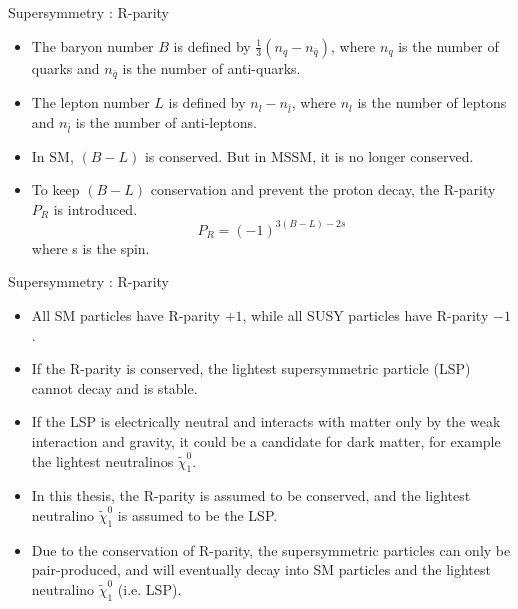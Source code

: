 \documentclass[mathserif,serif]{beamer}
\begin{document}
\begin{frame}{Supersymmetry : R-parity}
\begin{itemize}
\item The baryon number $B$ is defined by $\frac{1}{3} (n_q - n_{\bar{q}})$, where $n_q$ is the number of quarks and $n_{\bar{q}}$ is the number of anti-quarks.
\item The lepton number $L$ is defined by $n_l - n_{\bar{l}}$, where $n_l$ is the number of leptons and $n_{\bar{l}}$ is the number of anti-leptons.
\item In SM, $(B-L)$ is conserved. But in MSSM, it is no longer conserved.
\item To keep $(B-L)$ conservation and prevent the proton decay, the R-parity $P_R$ is introduced.
\begin{equation*}
P_R = (-1)^{3(B-L)-2s}
\end{equation*}
where s is the spin.
\end{itemize}
\end{frame}

\begin{frame}{Supersymmetry : R-parity}
\begin{itemize}
\item All SM particles have R-parity $+1$, while all SUSY particles have R-parity $-1$.
\item If the R-parity is conserved, the lightest supersymmetric particle (LSP) cannot decay and is stable.
\item If the LSP is electrically neutral and interacts with matter only by the weak interaction and gravity, it could be a candidate for dark matter, for example the lightest neutralinos $\tilde{\chi}_1^0$.
\item In this thesis, the R-parity is assumed to be conserved, and the lightest neutralino $\tilde{\chi}_1^0$ is assumed to be the LSP.
\item Due to the conservation of R-parity, the supersymmetric particles can only be pair-produced, and will eventually decay into SM particles and the lightest neutralino $\tilde{\chi}_1^0$ (i.e. LSP).
\end{itemize}
\end{frame}
\end{document}
